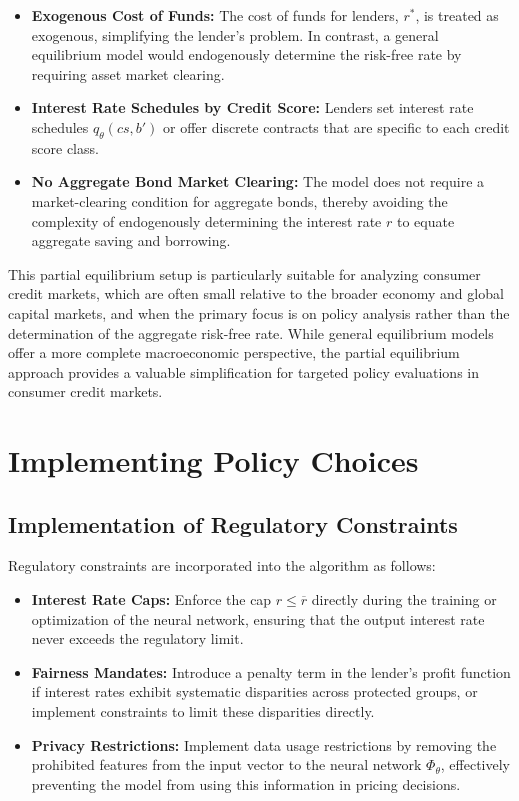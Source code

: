 \documentclass[acmsmall]{acmart}
\begin{document}
\begin{itemize}
    \item \textbf{Exogenous Cost of Funds:} The cost of funds for lenders, $r^*$, is treated as exogenous, simplifying the lender's problem. In contrast, a general equilibrium model would endogenously determine the risk-free rate by requiring asset market clearing.
    \item \textbf{Interest Rate Schedules by Credit Score:} Lenders set interest rate schedules $q_\theta(cs,b')$ or offer discrete contracts that are specific to each credit score class.
    \item \textbf{No Aggregate Bond Market Clearing:} The model does not require a market-clearing condition for aggregate bonds, thereby avoiding the complexity of endogenously determining the interest rate $r$ to equate aggregate saving and borrowing.
\end{itemize}
This partial equilibrium setup is particularly suitable for analyzing consumer credit markets, which are often small relative to the broader economy and global capital markets, and when the primary focus is on policy analysis rather than the determination of the aggregate risk-free rate. While general equilibrium models offer a more complete macroeconomic perspective, the partial equilibrium approach provides a valuable simplification for targeted policy evaluations in consumer credit markets.

\section{Implementing Policy Choices}


\subsection{Implementation of Regulatory Constraints}

Regulatory constraints are incorporated into the algorithm as follows:

\begin{itemize}
    \item \textbf{Interest Rate Caps:} Enforce the cap $r \leq \overline{r}$ directly during the training or optimization of the neural network, ensuring that the output interest rate never exceeds the regulatory limit.
    \item \textbf{Fairness Mandates:} Introduce a penalty term in the lender's profit function if interest rates exhibit systematic disparities across protected groups, or implement constraints to limit these disparities directly.
    \item \textbf{Privacy Restrictions:}  Implement data usage restrictions by removing the prohibited features from the input vector to the neural network $\Phi_\theta$, effectively preventing the model from using this information in pricing decisions.
\end{itemize}
\end{document}
